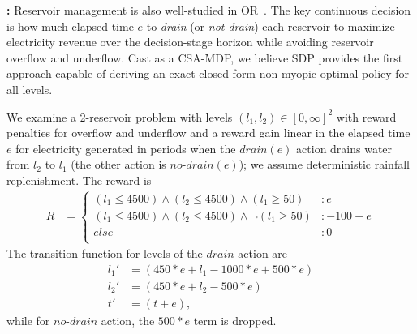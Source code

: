 
{\bf \WaterReservoir:} Reservoir management is also well-studied in
OR~\cite{Mahootchi2009,Yeh1985}.  The key continuous decision is how
much elapsed time $e$ to
\emph{drain} (or \emph{not drain}) each reservoir to maximize
electricity revenue over the decision-stage horizon while avoiding
reservoir overflow and underflow.  Cast as a CSA-MDP, we 
believe SDP provides the first approach capable of deriving
an exact closed-form non-myopic optimal policy
for all levels.

We examine a 2-reservoir problem with
levels $(l_1,l_2)\in [0,\infty]^2$ with reward penalties for 
overflow and underflow and a reward gain linear in the elapsed time $e$ for
electricity generated in periods when the $\mathit{drain}(e)$ action
drains water from $l_2$ to $l_1$ (the other action is 
$\mathit{no}$-$\mathit{drain}(e)$); we assume deterministic rainfall
replenishment.  The reward is
{\footnotesize
\begin{align*}
R & = \begin{cases}
(l_1 \leq 4500) \wedge (l_2 \leq 4500) \wedge (l_1 \geq 50) &:e\\
(l_1 \leq 4500) \wedge (l_2 \leq 4500) \wedge \neg (l_1 \geq 50)& :  -100 + e \\
else &: 0\\
\end{cases}
\end{align*}}
The transition function for levels of the $\mathit{drain}$ action are
{\footnotesize 
\begin{align*}
l_1' & =(450 * e + l_1 -1000 * e + 500 * e) \\
l_2'& =(450 * e + l_2 - 500 * e) \\
t'& =(t+e),
\end{align*}}
while for $\mathit{no}$-$\mathit{drain}$ action, the $\mathit{500 * e}$ term is dropped.

